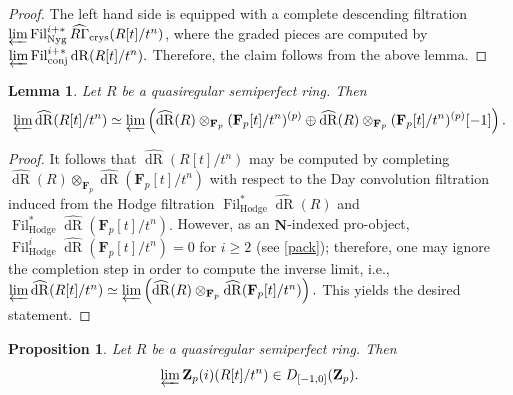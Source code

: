 \documentclass[10pt,letterpaper]{amsart}
\numberwithin{figure}{section}
\numberwithin{equation}{section}
\newtheorem{lemma}[figure]{Lemma}
\newtheorem{proposition}[figure]{Proposition}
\theoremstyle{definition}
\theoremstyle{definition}
\theoremstyle{definition}
\theoremstyle{definition}
\DeclareMathOperator{\conj}{conj}
\DeclareMathOperator{\Hodge}{Hodge}
\DeclareMathOperator{\Fil}{Fil}
\DeclareMathOperator{\dR}{dR}
\newcommand{\Z}{\mathbf{Z}}
\newcommand{\F}{\mathbf{F}}
\begin{document}
\begin{proof}
    The left hand side is equipped with a complete descending filtration $\varprojlim\Fil_{\mathrm{Nyg}}^{i+*} \widehat{R\Gamma}_{\mathrm{crys}}(R[t]/t^n)$, where the graded pieces are computed by $\varprojlim \Fil^{i+*}_{\conj}\mathrm{dR} (R[t]/t^n).$ Therefore, the claim follows from the above lemma.
\end{proof}{}




\begin{lemma}\label{fight}
    Let $R$ be a quasiregular semiperfect ring. Then $$\varprojlim \widehat{\dR}(R[t]/t^n) \simeq \varprojlim \left(\widehat{\dR}(R) \otimes_{\F_p} (\F_p[t] /t^n)^{(p)} \oplus \widehat{\dR}(R) \otimes_{\F_p} (\F_p[t] /t^n)^{(p)}[-1]\right). $$
\end{lemma}{}



\begin{proof}
It follows that $\widehat{\dR}(R[t]/t^n)$ may be computed by completing $\widehat{\dR}(R) \otimes_{\F_p} \widehat{\dR} (\F_p [t]/t^n)$ with respect to the Day convolution filtration induced from the Hodge filtration $\Fil^*_{\Hodge}\widehat{\dR}(R)$ and $\Fil^*_{\Hodge} \widehat{\dR}(\mathbf F_p[t]/t^n).$ However, as an $\mathbf N$-indexed pro-object, $\Fil^i_{\Hodge} \widehat{\dR}(\mathbf{F}_p[t]/t^n) = 0$ for $i \ge 2$ (see \cref{pack}); therefore, one may ignore the completion step in order to compute the inverse limit, i.e., $\varprojlim \widehat{\dR}(R[t]/t^n) \simeq \varprojlim \left(\widehat{\dR}(R) \otimes_{\F_p} \widehat{\dR} (\F_p [t]/t^n)\right).$ This yields the desired statement.
\end{proof}{}





\begin{proposition}\label{LY}
    Let $R$ be a quasiregular semiperfect ring. Then $$ \varprojlim \Z_p(i)(R[t]/t^n) \in D_{[-1,0]} (\Z_p).$$
\end{proposition}{}
\end{document}
